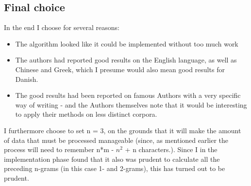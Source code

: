 \subsection{Final choice}

In the end I choose \cite{nr4} for several reasons:
\begin{itemize}
\item The algorithm looked like it could be implemented without too much work
\item The authors had reported good results on the English language, as well as Chinese and Greek, which I presume would also mean good results for Danish.
\item The good results had been reported on famous Authors with a very specific way of writing - and the Authors themselves note that it would be interesting to apply their methods on less distinct corpora. 
\end{itemize}

I furthermore choose to set n = 3, on the grounds that it will make the amount of data that must be processed manageable (since, as mentioned earlier the process will need to remember n*m - $n^2$ + n characters.). Since I in the implementation phase found that it also was prudent to calculate all the preceding n-grams (in this case 1- and 2-grams), this has turned out to be prudent.
